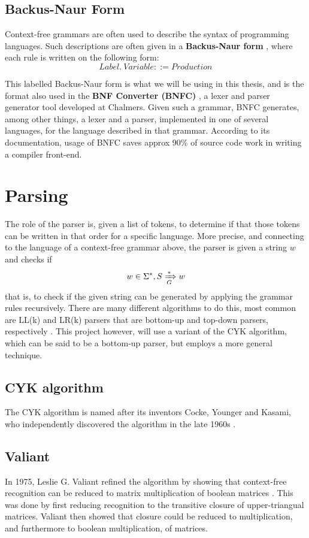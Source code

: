 \documentclass[a4paper,12pt,twosided]{report}
\begin{document}
\subsection{Backus-Naur Form}
Context-free grammars are often used to describe the syntax of programming
languages. Such descriptions are often given in a \textbf{Backus-Naur form}
\cite{backusform}, where each rule is written on the following form:
\[
Label.\ Variable ::= Production 
\]

This labelled Backus-Naur form is what we will be using in this thesis, and is
the format also used in the \textbf{BNF Converter (BNFC)} \cite{bnfc}, a lexer
and parser generator tool developed at Chalmers.  Given such a grammar, BNFC
generates, among other things, a lexer and a parser, implemented in one of
several languages, for the language described in that grammar. According to its
documentation, usage of BNFC saves approx 90\% of source code work in writing a
compiler front-end. 

\section{Parsing}
\label{parsingsection}
The role of the parser is, given a list of tokens, to determine if that those
tokens can be written in that order for a specific language. More precise, and
connecting to the language of a context-free grammar above, the parser is given
a string $w$ and checks if 
\[
w \in \Sigma^*, S \xRightarrow[G]{*} w
\]
that is, to check if the given string can be generated by applying the grammar
rules recursively. There are many different algorithms to do this, most common
are LL(k) and LR(k) parsers that are bottom-up and top-down parsers,
respectively \cite[p.192]{dragonbook}. This project however, will use a variant
of the CYK algorithm, which can be said to be a bottom-up parser, but employs a
more general technique.

\subsection{CYK algorithm}
The CYK algorithm is named after its inventors Cocke, Younger and Kasami, who
independently discovered the algorithm in the late 1960s \cite{Younger67}.

\subsection{Valiant}
In 1975, Leslie G. Valiant refined the algorithm by showing that context-free
recognition can be reduced to matrix multiplication of boolean matrices
\cite{Valiant75}. This was done by first reducing recognition to the transitive
closure of upper-triangual matrices. Valiant then showed that closure could be
reduced to multiplication, and furthermore to boolean multiplication, of
matrices. 
\end{document}
